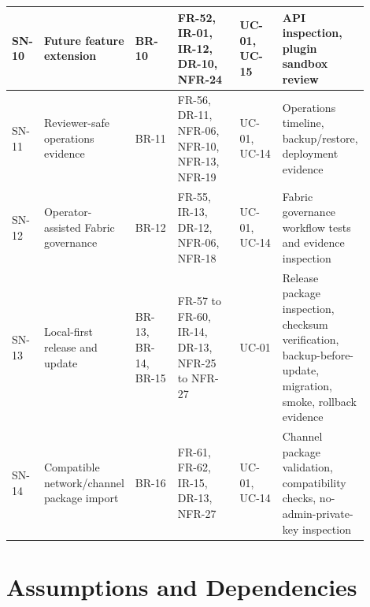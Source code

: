 \documentclass[11pt,a4paper]{article}
\begin{document}
\begin{landscape}
\begin{footnotesize}
\begin{longtable}{@{}p{0.08\linewidth}p{0.16\linewidth}p{0.14\linewidth}p{0.22\linewidth}p{0.14\linewidth}p{0.16\linewidth}@{}}
SN-10 & Future feature extension & BR-10 & FR-52, IR-01, IR-12, DR-10, NFR-24 & UC-01, UC-15 & API inspection, plugin sandbox review \\ \hline
SN-11 & Reviewer-safe operations evidence & BR-11 & FR-56, DR-11, NFR-06, NFR-10, NFR-13, NFR-19 & UC-01, UC-14 & Operations timeline, backup/restore, deployment evidence \\ \hline
SN-12 & Operator-assisted Fabric governance & BR-12 & FR-55, IR-13, DR-12, NFR-06, NFR-18 & UC-01, UC-14 & Fabric governance workflow tests and evidence inspection \\ \hline
SN-13 & Local-first release and update & BR-13, BR-14, BR-15 & FR-57 to FR-60, IR-14, DR-13, NFR-25 to NFR-27 & UC-01 & Release package inspection, checksum verification, backup-before-update, migration, smoke, rollback evidence \\ \hline
SN-14 & Compatible network/channel package import & BR-16 & FR-61, FR-62, IR-15, DR-13, NFR-27 & UC-01, UC-14 & Channel package validation, compatibility checks, no-admin-private-key inspection \\ \hline

\end{longtable}
\end{footnotesize}
\end{landscape}

\appendix
\section{Assumptions and Dependencies}
\end{document}
